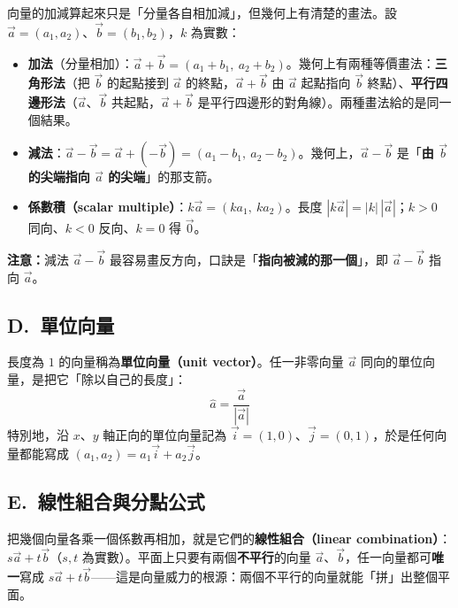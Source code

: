 \documentclass[11pt]{article}
\begin{document}
向量的加減算起來只是「分量各自相加減」，但幾何上有清楚的畫法。設 $\vec a=(a_1,a_2)$、$\vec b=(b_1,b_2)$，$k$ 為實數：

\begin{itemize}\setlength{\itemsep}{2pt}
\item \textbf{加法}（分量相加）：$\vec a+\vec b=(a_1+b_1,\ a_2+b_2)$。幾何上有兩種等價畫法：\textbf{三角形法}（把 $\vec b$ 的起點接到 $\vec a$ 的終點，$\vec a+\vec b$ 由 $\vec a$ 起點指向 $\vec b$ 終點）、\textbf{平行四邊形法}（$\vec a$、$\vec b$ 共起點，$\vec a+\vec b$ 是平行四邊形的對角線）。兩種畫法給的是同一個結果。
\item \textbf{減法}：$\vec a-\vec b=\vec a+(-\vec b)=(a_1-b_1,\ a_2-b_2)$。幾何上，$\vec a-\vec b$ 是「\textbf{由 $\vec b$ 的尖端指向 $\vec a$ 的尖端}」的那支箭。
\item \textbf{係數積（scalar multiple）}：$k\vec a=(ka_1,\ ka_2)$。長度 $|k\vec a|=|k|\,|\vec a|$；$k>0$ 同向、$k<0$ 反向、$k=0$ 得 $\vec 0$。
\end{itemize}

\textbf{注意：}減法 $\vec a-\vec b$ 最容易畫反方向，口訣是「\textbf{指向被減的那一個}」，即 $\vec a-\vec b$ 指向 $\vec a$。


\subsection*{\sffamily D.\ 單位向量}

長度為 $1$ 的向量稱為\textbf{單位向量（unit vector）}。任一非零向量 $\vec a$ 同向的單位向量，是把它「除以自己的長度」：
$$\boxed{\;\hat a=\frac{\vec a}{|\vec a|}\;}$$
特別地，沿 $x$、$y$ 軸正向的單位向量記為 $\vec i=(1,0)$、$\vec j=(0,1)$，於是任何向量都能寫成 $(a_1,a_2)=a_1\vec i+a_2\vec j$。

\subsection*{\sffamily E.\ 線性組合與分點公式}

把幾個向量各乘一個係數再相加，就是它們的\textbf{線性組合（linear combination）}：$s\vec a+t\vec b$（$s,t$ 為實數）。平面上只要有兩個\textbf{不平行}的向量 $\vec a$、$\vec b$，任一向量都可\textbf{唯一}寫成 $s\vec a+t\vec b$——這是向量威力的根源：兩個不平行的向量就能「拼」出整個平面。
\end{document}
